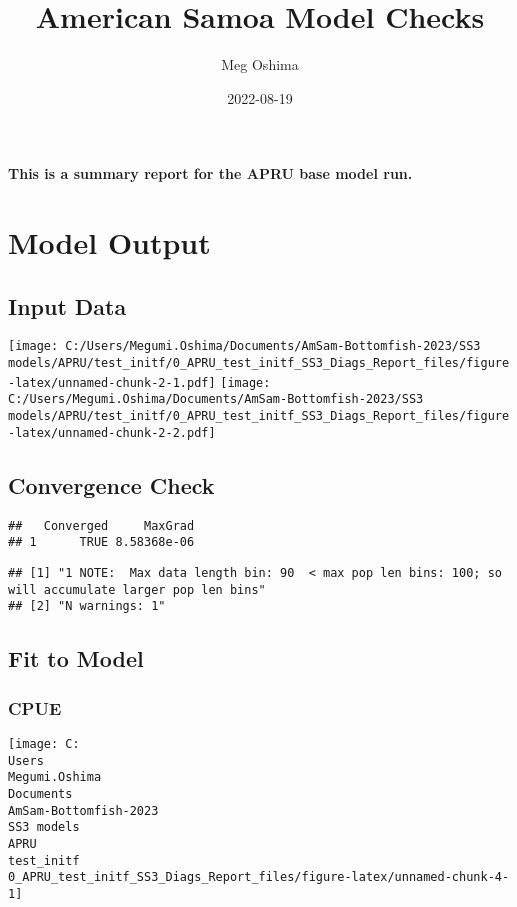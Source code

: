 \documentclass[
]{article}
\title{American Samoa Model Checks}
\author{Meg Oshima}
\date{2022-08-19}
\begin{document}
\maketitle

\textbf{This is a summary report for the APRU base model run.}

\hypertarget{model-output}{%
\section{Model Output}\label{model-output}}

\hypertarget{input-data}{%
\subsection{Input Data}\label{input-data}}

\texttt{[image: C:/Users/Megumi.Oshima/Documents/AmSam-Bottomfish-2023/SS3 models/APRU/test\_initf/0\_APRU\_test\_initf\_SS3\_Diags\_Report\_files/figure-latex/unnamed-chunk-2-1.pdf]}
\texttt{[image: C:/Users/Megumi.Oshima/Documents/AmSam-Bottomfish-2023/SS3 models/APRU/test\_initf/0\_APRU\_test\_initf\_SS3\_Diags\_Report\_files/figure-latex/unnamed-chunk-2-2.pdf]}

\hypertarget{convergence-check}{%
\subsection{Convergence Check}\label{convergence-check}}

\begin{verbatim}
##   Converged     MaxGrad
## 1      TRUE 8.58368e-06
\end{verbatim}

\begin{verbatim}
## [1] "1 NOTE:  Max data length bin: 90  < max pop len bins: 100; so will accumulate larger pop len bins"
## [2] "N warnings: 1"
\end{verbatim}

\hypertarget{fit-to-model}{%
\subsection{Fit to Model}\label{fit-to-model}}

\hypertarget{cpue}{%
\subsubsection{CPUE}\label{cpue}}

\begin{center}\texttt{[image: C:\\Users\\Megumi.Oshima\\Documents\\AmSam-Bottomfish-2023\\SS3 models\\APRU\\test\_initf\\0\_APRU\_test\_initf\_SS3\_Diags\_Report\_files/figure-latex/unnamed-chunk-4-1]} \end{center}
\end{document}
